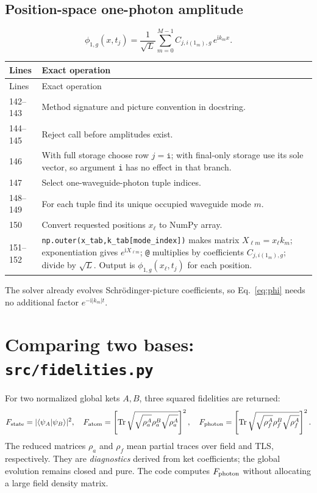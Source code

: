 \documentclass[11pt,a4paper]{article}
\newcommand{\code}[1]{\nolinkurl{#1}}
\newcommand{\Tr}{\operatorname{Tr}}
\newcommand{\ii}{\mathrm i}
\begin{document}
\subsection{Position-space one-photon amplitude}

\begin{equation}
\phi_{1,g}(x,t_j)=\frac1{\sqrt L}
\sum_{m=0}^{M-1}
C_{j,i(1_m),g}\,e^{\ii k_mx}.
\label{eq:phi}
\end{equation}
\begin{longtable}{p{}p{}}
\toprule Lines & Exact operation\\\midrule\endfirsthead
\toprule Lines & Exact operation\\\midrule\endhead
142--143 & Method signature and picture convention in docstring.\\
144--145 & Reject call before amplitudes exist.\\
146 & With full storage choose row $j=\texttt{i}$; with final-only storage use its sole vector, so argument \code{i} has no effect in that branch.\\
147 & Select one-waveguide-photon tuple indices.\\
148--149 & For each tuple find its unique occupied waveguide mode $m$.\\
150 & Convert requested positions $x_\ell$ to NumPy array.\\
151--152 & \code{np.outer(x_tab,k_tab[mode_index])} makes matrix $X_{\ell m}=x_\ell k_m$; exponentiation gives $e^{\ii X_{\ell m}}$; \code{@} multiplies by coefficients $C_{j,i(1_m),g}$; divide by $\sqrt L$. Output is $\phi_{1,g}(x_\ell,t_j)$ for each position.\\
\bottomrule
\end{longtable}
The solver already evolves Schr\"odinger-picture coefficients, so Eq.~\eqref{eq:phi}
needs no additional factor $e^{-\ii|k_m|t}$.

\section{Comparing two bases: \code{src/fidelities.py}}
For two normalized global kets $A,B$, three squared fidelities are returned:
\begin{equation}
F_{\rm state}=|\langle\psi_A|\psi_B\rangle|^2,\quad
F_{\rm atom}=\left[\Tr\sqrt{\sqrt{\rho_a^A}\rho_a^B
  \sqrt{\rho_a^A}}\right]^2,\quad
F_{\rm photon}=\left[\Tr\sqrt{\sqrt{\rho_f^A}\rho_f^B
  \sqrt{\rho_f^A}}\right]^2.
\label{eq:fids}
\end{equation}
The reduced matrices $\rho_a$ and $\rho_f$ mean partial traces over field and
TLS, respectively. They are \emph{diagnostics} derived from ket coefficients;
the global evolution remains closed and pure. The code computes $F_{\rm photon}$
without allocating a large field density matrix.
\end{document}
